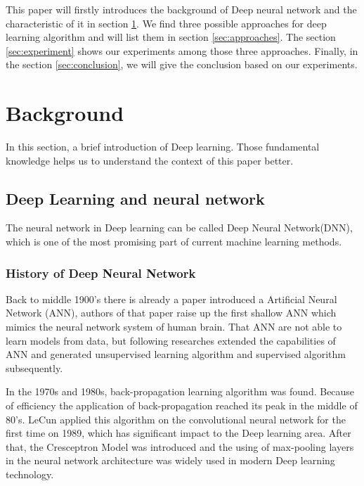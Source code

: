 \documentclass[article]{aaltoseries}
\begin{document}
This paper will firstly introduces the background of Deep neural network and the characteristic of it in section \ref{sec:background}.
We find three possible approaches for deep learning algorithm and will list them in section \ref{sec:approaches}.
The section \ref{sec:experiment} shows our experiments among those three approaches.
Finally, in the section \ref{sec:conclusion}, we will give the conclusion based on our experiments.








\section{Background}
\label{sec:background}

In this section, a brief introduction of Deep learning. Those fundamental 
knowledge helps us to understand the context of this paper better.




\subsection{Deep Learning and neural network}

The neural network in Deep learning can be called Deep Neural Network(DNN), which is one of the most promising 
part of current machine learning methods. 

\subsubsection{History of Deep Neural Network}

Back to middle 1900's there is already a paper introduced a Artificial Neural Network (ANN)\cite{Warren1943}, authors
of that paper raise up the first shallow ANN which mimics the neural network system of human brain. That ANN are not
able to learn models from data, but following researches extended the capabilities of ANN and generated unsupervised 
learning algorithm and supervised algorithm subsequently.

In the 1970s and 1980s, back-propagation learning algorithm was found. Because of efficiency the application of back-propagation
reached its peak in the middle of 80's. LeCun applied this algorithm on the convolutional neural network 
for the first time on 1989, which has significant impact to the Deep learning area. After that, the Cresceptron Model was introduced
and the using of max-pooling layers in the neural network architecture was widely used in modern Deep learning technology.
\end{document}
